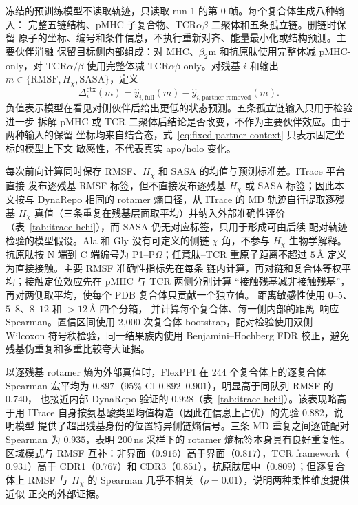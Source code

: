 冻结的预训练模型不读取轨迹，只读取 run-1 的第 0 帧。每个复合体生成八种输入：
完整五链结构、pMHC 子复合物、TCR$\alpha\beta$ 二聚体和五条孤立链。删链时保留
原子的坐标、编号和条件信息，不执行重新对齐、能量最小化或结构预测。主要伙伴消融
保留目标侧内部组成：对 MHC、$\beta_2$m 和抗原肽使用完整体减 pMHC-only，对
TCR$\alpha/\beta$ 使用完整体减 TCR$\alpha\beta$-only。对残基 $i$ 和输出
$m\in\{\mathrm{RMSF},H_\chi,\mathrm{SASA}\}$，定义
\begin{equation}
  \Delta_i^{\mathrm{ctx}}(m)=
  \widehat y_{i,\mathrm{full}}(m)-
  \widehat y_{i,\mathrm{partner\mbox{-}removed}}(m).
  \label{eq:fixed-partner-context}
\end{equation}
负值表示模型在看见对侧伙伴后给出更低的状态预测。五条孤立链输入只用于检验进一步
拆解 pMHC 或 TCR 二聚体后结论是否改变，不作为主要伙伴效应。由于两种输入的保留
坐标均来自结合态，式~\eqref{eq:fixed-partner-context} 只表示固定坐标的模型上下文
敏感性，不代表真实 apo/holo 变化。

每次前向计算同时保存 RMSF、$H_\chi$ 和 SASA 的均值与预测标准差。ITrace 平台直接
发布逐残基 RMSF 标签，但不直接发布逐残基 $H_\chi$ 或 SASA 标签；因此本文按与
DynaRepo 相同的 rotamer 熵口径，从 ITrace 的 MD 轨迹自行提取逐残基 $H_\chi$
真值（三条重复在残基层面取平均）并纳入外部准确性评价
（表~\ref{tab:itrace-hchi}），而 SASA 仍无对应标签，只用于形成可由后续
配对轨迹检验的模型假设。Ala 和 Gly 没有可定义的侧链 $\chi$ 角，不参与
$H_\chi$ 生物学解释。抗原肽按 N 端到 C 端编号为 P1--P$\Omega$；任意肽--TCR
重原子距离不超过 $5\,\text{\AA}$ 定义为直接接触。主要 RMSF 准确性指标先在每条
链内计算，再对链和复合体等权平均；接触定位效应先在 pMHC 与 TCR 两侧分别计算
“接触残基减非接触残基”，再对两侧取平均，使每个 PDB 复合体只贡献一个独立值。
距离敏感性使用 $0$--$5$、$5$--$8$、$8$--$12$ 和 $>12\,\text{\AA}$ 四个分箱，
并计算每个复合体、每一侧内部的距离--响应 Spearman。置信区间使用 2,000 次复合体
bootstrap，配对检验使用双侧 Wilcoxon 符号秩检验，同一结果族内使用
Benjamini--Hochberg FDR 校正，避免残基伪重复和多重比较夸大证据。

以逐残基 rotamer 熵为外部真值时，FlexPPI 在 244 个复合体上的逐复合体 Spearman
宏平均为 $0.897$（95\% CI $0.892$--$0.901$），明显高于同队列 RMSF 的 $0.740$，
也接近内部 DynaRepo 验证的 $0.928$（表~\ref{tab:itrace-hchi}）。该表现略高于用
ITrace 自身按氨基酸类型均值构造（因此在信息上占优）的先验 $0.882$，说明模型
提供了超出残基身份的位置特异侧链熵信号。三条 MD 重复之间逐链配对 Spearman 为
$0.935$，表明 200\,ns 采样下的 rotamer 熵标签本身具有良好重复性。区域模式与
RMSF 互补：非界面（$0.916$）高于界面（$0.817$），TCR framework（$0.931$）高于
CDR1（$0.767$）和 CDR3（$0.851$），抗原肽居中（$0.809$）；但逐复合体上 RMSF
与 $H_\chi$ 的 Spearman 几乎不相关（$\rho=0.01$），说明两种柔性维度提供近似
正交的外部证据。

